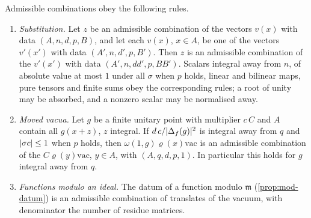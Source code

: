 \begin{proposition}\label{prop:admissible-rules}
Admissible combinations obey the following rules.
\begin{enumerate}[label=\textup{(\alph*)}]
\item \emph{Substitution.} Let $z$ be an admissible combination of the vectors $v(x)$ with data $(A,n,d,p,B)$, and let each
$v(x)$, $x\in A$, be one of the vectors $v'(x')$ with data $(A',n,d',p,B')$. Then $z$ is an admissible combination of the
$v'(x')$ with data $(A',n,dd',p,BB')$. Scalars integral away from $n$, of
absolute value at most $1$ under all $\sigma$ when $p$ holds, linear and bilinear maps, pure tensors and finite sums obey
the corresponding rules; a root of unity may be absorbed, and a nonzero scalar may be normalised away.
\item \emph{Moved vacua.} Let $g$ be a finite unitary point with multiplier $c\,C$ and $A$ contain all $g(x+z)$, $z$ integral. If
$d\,c/\lvert \Delta_f(g)\rvert^2$ is integral away from $q$ and $\lvert \sigma c\rvert\le1$ when $p$ holds, then $\omega(1,g)\varrho(x)\mathrm{vac}$ is an
admissible combination of the $C\varrho(y)\mathrm{vac}$, $y\in A$, with $(A,q,d,p,1)$. In particular this holds for $g$ integral away from $q$.
\item \emph{Functions modulo an ideal.} The datum of a function modulo $\mathfrak m$ (\cref{prop:mod-datum}) is an admissible
combination of translates of the vacuum, with denominator the number of residue matrices.
\end{enumerate}
\end{proposition}

